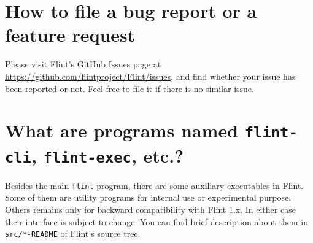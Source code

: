 \documentclass[a4paper,10pt]{report}
\newcommand{\filename}[1]{{\tt #1}}
\begin{document}
\section{How to file a bug report or a feature request}
Please visit Flint's GitHub Issues page at
\url{https://github.com/flintproject/Flint/issues},
and find whether your issue has been reported or not.
Feel free to file it if there is no similar issue.

\section{What are programs named \filename{flint-cli}, \filename{flint-exec}, etc.?}
Besides the main \filename{flint} program, there are some auxiliary executables in
Flint. Some of them are utility programs for internal use or experimental
purpose. Others remains only for backward compatibility with Flint 1.x. In
either case their interface is subject to change. You can find brief description about
them in \filename{src/*-README} of Flint's source tree.




\end{document}
